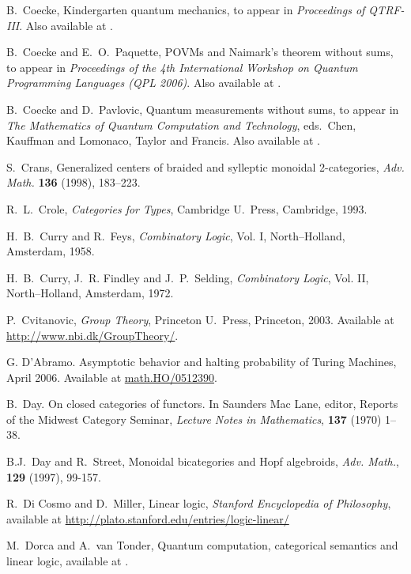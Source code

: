 \documentclass[12pt,twoside,openright]{report}
\begin{document}
\begin{thebibliography}{99}
 B.\ Coecke, Kindergarten quantum mechanics, to appear in {\sl Proceedings of QTRF-III}.  Also available at
.

 B.\ Coecke and E.\ O.\ Paquette, POVMs and Naimark's theorem without sums, to appear in {\sl Proceedings of the 4th International Workshop on Quantum Programming Languages (QPL 2006)}. Also available at .

 B.\ Coecke and D.\ Pavlovic, Quantum measurements without sums, to appear in {\sl The Mathematics of Quantum Computation and Technology}, eds.\ Chen, Kauffman and Lomonaco, Taylor and Francis. Also available at .

 S.\ Crans, Generalized centers of braided and sylleptic monoidal 2-categories, \textsl{Adv. Math.} \textbf{136} (1998), 183--223.

 R.\ L.\ Crole, {\sl Categories for Types}, Cambridge U.\ Press, Cambridge, 1993.

 H.\ B.\ Curry and R.\ Feys, {\sl Combinatory Logic}, Vol. I, North--Holland, Amsterdam, 1958.

H.\ B.\ Curry, J.\ R. Findley and J.\ P.\ Selding, {\sl Combinatory Logic}, Vol. II, North--Holland, Amsterdam, 1972.

 P.\ Cvitanovic, \textsl{Group Theory}, Princeton U.\ Press, Princeton, 2003.  Available at \hfill \break
\href{http://www.nbi.dk/GroupTheory/}{
http://www.nbi.dk/GroupTheory/}.

 G. D'Abramo. Asymptotic behavior and halting probability of Turing Machines, April 2006.  Available at \href{http://arxiv.org/abs/math/0512390}{math.HO/0512390}.

 B.\ Day. On closed categories of functors. In Saunders Mac Lane, editor, Reports of the Midwest Category Seminar, {\sl Lecture Notes in Mathematics}, \textbf{137} (1970) 1--38.

 B.J.\ Day and R.\ Street, Monoidal bicategories and Hopf algebroids, \textsl{Adv. Math.}, \textbf{129} (1997), 99-157.

 R.\ Di Cosmo and D.\ Miller, Linear logic,
{\sl Stanford Encyclopedia of Philosophy}, available at 
\href{http://plato.stanford.edu/entries/logic-linear/}
{http://plato.stanford.edu/entries/logic-linear/}

 M.\ Dorca and A.\ van Tonder, Quantum computation, categorical semantics and linear logic, available at .
 

\end{thebibliography}
\end{document}
